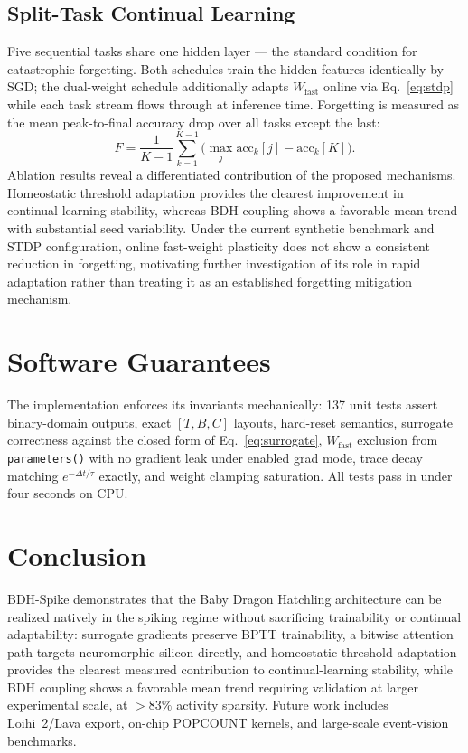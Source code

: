 \documentclass[11pt]{article}
\newcommand{\Wfast}{W_{\text{fast}}}
\begin{document}
\subsection{Split-Task Continual Learning}
Five sequential tasks share one hidden layer --- the standard condition for
catastrophic forgetting. Both schedules train the hidden features
identically by SGD; the dual-weight schedule additionally adapts $\Wfast$
online via Eq.~\eqref{eq:stdp} while each task stream flows through at
inference time. Forgetting is measured as the mean peak-to-final accuracy
drop over all tasks except the last:
\begin{equation}
F = \frac{1}{K-1}\sum_{k=1}^{K-1}
\Big(\max_j \mathrm{acc}_k[j] - \mathrm{acc}_k[K]\Big).
\end{equation}
Ablation results reveal a differentiated contribution of the proposed mechanisms. Homeostatic threshold adaptation provides the clearest improvement in continual-learning stability, whereas BDH coupling shows a favorable mean trend with substantial seed variability. Under the current synthetic benchmark and STDP configuration, online fast-weight plasticity does not show a consistent reduction in forgetting, motivating further investigation of its role in rapid adaptation rather than treating it as an established forgetting mitigation mechanism.

\section{Software Guarantees}
The implementation enforces its invariants mechanically: 137 unit tests
assert binary-domain outputs, exact $[T,B,C]$ layouts, hard-reset semantics,
surrogate correctness against the closed form of Eq.~\eqref{eq:surrogate},
$\Wfast$ exclusion from \texttt{parameters()} with no gradient leak under
enabled grad mode, trace decay matching $e^{-\Delta t/\tau}$ exactly, and
weight clamping saturation. All tests pass in under four seconds on CPU.

\section{Conclusion}
BDH-Spike demonstrates that the Baby Dragon Hatchling architecture can be
realized natively in the spiking regime without sacrificing trainability or
continual adaptability: surrogate gradients preserve BPTT trainability, a
bitwise attention path targets neuromorphic silicon directly, and
homeostatic threshold adaptation provides the clearest measured contribution to continual-learning stability, while BDH coupling shows a favorable mean trend requiring validation at larger experimental scale,
at $>83\%$ activity sparsity. Future work includes Loihi~2/Lava export,
on-chip POPCOUNT kernels, and large-scale event-vision benchmarks.
\end{document}
